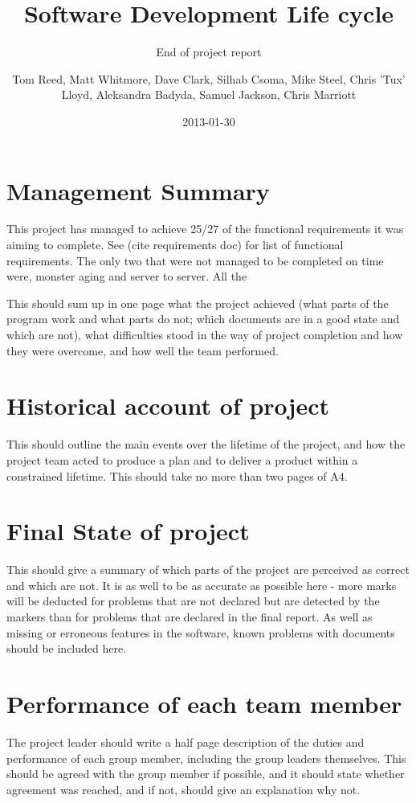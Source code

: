\documentclass{project}
\begin{document}
\title{Software Development Life cycle}
\subtitle{End of project report}
\author{Tom Reed, Matt Whitmore, Dave Clark, Silhab Csoma, Mike Steel, Chris 'Tux' Lloyd, Aleksandra Badyda, Samuel Jackson, Chris Marriott}
\date{2013-01-30}
\maketitle
\tableofcontents
\newpage
\section{Management Summary}
This project has managed to achieve 25/27 of the functional requirements it was aiming to complete. See (cite requirements doc) for list of functional requirements. The only two that were not managed to be completed on time were, monster aging and server to server. All the 

This should sum up in one page what the project achieved (what parts of the program
work and what parts do not; which documents are in a good state and which are not), what difficulties stood in
the way of project completion and how they were overcome, and how well the team performed.
\section{Historical account of project}
This should outline the main events over the lifetime of the project, and how
the project team acted to produce a plan and to deliver a product within a constrained lifetime. This should take
no more than two pages of A4.

\section{Final State of project}
This should give a summary of which parts of the project are perceived as correct and
which are not. It is as well to be as accurate as possible here - more marks will be deducted for problems that are
not declared but are detected by the markers than for problems that are declared in the final report. As well as
missing or erroneous features in the software, known problems with documents should be included here.

\section{Performance of each team member}
The project leader should write a half page description of the duties and
performance of each group member, including the group leaders themselves. This should be agreed with the
group member if possible, and it should state whether agreement was reached, and if not, should give an
explanation why not.
\end{document}
